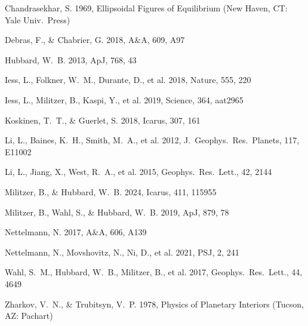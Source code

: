 \documentclass{aastex631}
\begin{document}
\begin{thebibliography}{}

Chandrasekhar, S. 1969, Ellipsoidal Figures of Equilibrium
(New Haven, CT: Yale Univ.\ Press)

Debras, F., \& Chabrier, G. 2018, A\&A, 609, A97

Hubbard, W.~B. 2013, ApJ, 768, 43

Iess, L., Folkner, W.~M., Durante, D., et al. 2018, Nature, 555, 220

Iess, L., Militzer, B., Kaspi, Y., et al. 2019, Science, 364, aat2965

Koskinen, T.~T., \& Guerlet, S. 2018, Icarus, 307, 161

Li, L., Baines, K.~H., Smith, M.~A., et al. 2012,
J.\ Geophys.\ Res.\ Planets, 117, E11002

Li, L., Jiang, X., West, R.~A., et al. 2015, Geophys.\ Res.\ Lett.,
42, 2144

Militzer, B., \& Hubbard, W.~B. 2024, Icarus, 411, 115955

Militzer, B., Wahl, S., \& Hubbard, W.~B. 2019, ApJ, 879, 78

Nettelmann, N. 2017, A\&A, 606, A139

Nettelmann, N., Movshovitz, N., Ni, D., et al. 2021, PSJ, 2, 241

Wahl, S.~M., Hubbard, W.~B., Militzer, B., et al. 2017,
Geophys.\ Res.\ Lett., 44, 4649

Zharkov, V.~N., \& Trubitsyn, V.~P. 1978, Physics of Planetary
Interiors (Tucson, AZ: Pachart)

\end{thebibliography}
\end{document}
